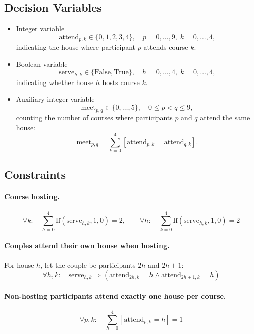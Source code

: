 \documentclass{article}
\begin{document}
\subsection{Decision Variables}
\begin{itemize}
    \item Integer variable 
    \[
        \text{attend}_{p,k} \in \{0,1,2,3,4\}, \quad p=0,\dots,9, \; k=0,\dots,4,
    \]
    indicating the house where participant $p$ attends course $k$.  

    \item Boolean variable 
    \[
        \text{serve}_{h,k} \in \{\text{False}, \text{True}\}, \quad h=0,\dots,4, \; k=0,\dots,4,
    \]
    indicating whether house $h$ hosts course $k$.

    \item Auxiliary integer variable 
    \[
        \text{meet}_{p,q} \in \{0,\dots,5\}, \quad 0 \le p < q \le 9,
    \]
    counting the number of courses where participants $p$ and $q$ attend the same house:
    \[
        \text{meet}_{p,q} = \sum_{k=0}^{4} [\text{attend}_{p,k} = \text{attend}_{q,k}].
    \]
\end{itemize}

\subsection{Constraints}

\paragraph{Course hosting.}
\[
\forall k:\quad \sum_{h=0}^{4} \text{If}(\text{serve}_{h,k}, 1, 0) = 2, \qquad
\forall h:\quad \sum_{k=0}^{4} \text{If}(\text{serve}_{h,k}, 1, 0) = 2
\]

\paragraph{Couples attend their own house when hosting.}  
For house $h$, let the couple be participants $2h$ and $2h+1$:
\[
\forall h,k:\quad \text{serve}_{h,k} \Rightarrow (\text{attend}_{2h,k}=h \wedge \text{attend}_{2h+1,k}=h)
\]

\paragraph{Non-hosting participants attend exactly one house per course.}
\[
\forall p,k:\quad \sum_{h=0}^{4} [\text{attend}_{p,k} = h] = 1
\]
\end{document}
